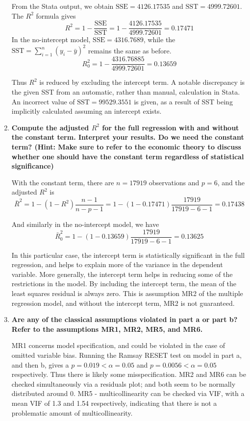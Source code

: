 \documentclass{article}
\begin{document}
\begin{enumerate}[label=\alph*.]
From the Stata output, we obtain $\text{SSE} = 4126.17535$ and $ \text{SST} = 4999.72601$. The $R^2$ formula gives
$$ R^2 = 1- \frac{\text{SSE}}{\text{SST}} = 1 - \frac{4126.17535}{4999.72601} = 0.17471$$
In the no-intercept model, $\text{SSE} = 4316.7689 $, while the $\text{SST} = \sum_{i=1}^n (y_i-\bar{y})^2$ remains the same as before.
$$ R_0^2 = 1- \frac{\text{4316.76885}}{\text{4999.72601}} =  0.13659$$



Thus $R^2$ is reduced by excluding the intercept term. A notable discrepancy is the given SST from an automatic, rather than manual, calculation in Stata. An incorrect value of $\text{SST} = 99529.3551 $ is given, as a result of SST being implicitly calculated assuming an intercept exists.


\item \textbf{Compute the adjusted $R^2$ for the full regression with and without the constant term. Interpret your results. Do we need the constant term? (Hint: Make sure to refer to the economic theory to discuss whether one should have the constant term regardless of statistical significance)}

With the constant term, there are $n = 17919$ observations and $p=6$, and the adjusted $R^2$ is
$$ \bar{R}^2 = 1 - (1-R^2) \frac{n-1}{n-p-1} = 1-(1-0.17471)\frac{17919}{17919-6-1} = 0.17438 $$

And similarly in the no-intercept model, we have
$$ \bar{R}_0^2 = 1-(1-0.13659)\frac{17919}{17919-6-1} = 0.13625 $$

In this particular case, the intercept term is statistically significant in the full regression, and helps to explain more of the variance in the dependent variable. More generally, the intercept term helps in reducing some of the restrictions in the model. By including the intercept term, the mean of the least squares residual is always zero. This is assumption MR2 of the multiple regression model, and without the intercept term, MR2 is not guaranteed.

\item \textbf{Are any of the classical assumptions violated in part a or part b? Refer to the assumptions MR1, MR2, MR5, and MR6.} 

MR1 concerns model specification, and could be violated in the case of omitted variable bias. Running the Ramsay RESET test on model in part a, and then b, gives a $p =0.019<\alpha =0.05$ and $p=0.0056 < \alpha = 0.05$ respectively. Thus there is likely some misspecification. MR2 and MR6 can be checked simultaneously via a residuals plot; and both seem to be normally distributed around 0. MR5 - multicollinearity can be checked via VIF, with a mean VIF of 1.3 and 1.54 respectively, indicating that there is not a problematic amount of multicollinearity. 

\end{enumerate}
\end{document}
